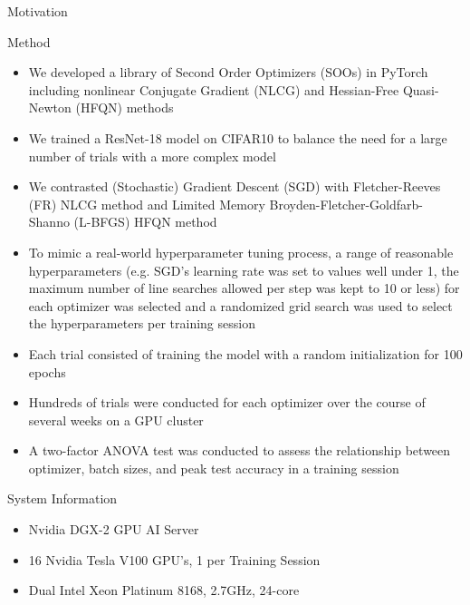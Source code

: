 \documentclass[final]{beamer}
\newlength{\colwidth}
\begin{document}
\begin{frame}[t]
\begin{columns}[t]
\begin{column}{\colwidth}
\begin{alertblock}{Motivation}
      \end{alertblock}

      \begin{block}{Method}
        \begin{itemize}
          \item We developed a library of Second Order Optimizers (SOOs) in PyTorch including nonlinear
                Conjugate Gradient (NLCG) and Hessian-Free Quasi-Newton (HFQN) methods
          \item We trained a ResNet-18 model on CIFAR10 to balance the need for a large
                number of trials with a more complex model
          \item We contrasted (Stochastic) Gradient Descent (SGD) with Fletcher-Reeves (FR) NLCG
                method and Limited Memory Broyden-Fletcher-Goldfarb-Shanno (L-BFGS) HFQN method
          \item To mimic a real-world hyperparameter tuning process, a range of reasonable
                hyperparameters (e.g. SGD's learning rate was set to values well under 1, the maximum
                number of line searches allowed per step was kept to 10 or less) for each optimizer was
                selected and a randomized grid search was used to select the hyperparameters per training
                session
          \item Each trial consisted of training the model with a random initialization for 100 epochs
          \item Hundreds of trials were conducted for each optimizer over the course of several
                weeks on a GPU cluster
          \item A two-factor ANOVA test was conducted to assess the relationship between optimizer,
                batch sizes, and peak test accuracy in a training session
        \end{itemize}

      \end{block}
      \begin{block}{System Information}
        \begin{itemize}
          \item Nvidia DGX-2 GPU AI Server
          \item 16 Nvidia Tesla V100 GPU's, 1 per Training Session
          \item Dual Intel Xeon Platinum 8168, 2.7GHz, 24-core
        \end{itemize}
      \end{block}


\end{column}
\end{columns}
\end{frame}
\end{document}
